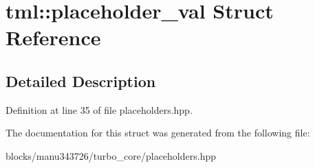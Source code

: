 \hypertarget{structtml_1_1placeholder__val}{\section{tml\+:\+:placeholder\+\_\+val Struct Reference}
\label{structtml_1_1placeholder__val}
}


\subsection{Detailed Description}


Definition at line 35 of file placeholders.\+hpp.



The documentation for this struct was generated from the following file\+:\begin{DoxyCompactItemize}
\item 
blocks/manu343726/turbo\+\_\+core/placeholders.\+hpp\end{DoxyCompactItemize}
